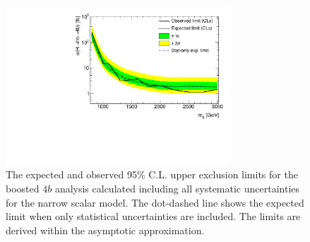 \begin{figure}
\begin{center}
\includegraphics[width=0.75\textwidth,angle=-90]{figures/boosted/results/limit_boosted_boosted_okt18_s.pdf}
\caption{The expected and observed 95\% C.L. upper exclusion limits for the boosted $4b$ analysis calculated including all systematic uncertainties for the narrow scalar model. The dot-dashed line shows the expected limit when only statistical uncertainties are included. The limits are derived within the asymptotic approximation.}
\label{fig:limit_scalar}
\end{center}
\end{figure}

